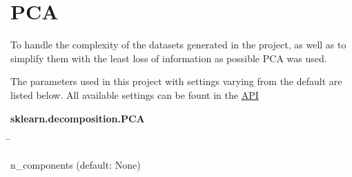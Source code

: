 \section{PCA} \label{sec:PCA}

To handle the complexity of the datasets generated in the project, as well as to simplify them with the least loss of information as possible \gls{PCA} was used. 

\autocite{jolliffe_principal_2016}
\autocite{pearson_liii_1901}

The parameters used in this project with settings varying from the default are listed below. All available settings can be fount in the
\href{https://scikit-learn.org/stable/modules/generated/sklearn.decomposition.PCA.html}{API} \autocite{pedregosa_scikit-learn_2011}

\begin{leftbar}
    \textbf{sklearn.decomposition.PCA}
    \begin{nstabbing}
        \qquad\qquad\qquad\qquad\qquad\quad\=\kill

        n\_components \> (default: None)
    \end{nstabbing}
\end{leftbar}

\begin{table}[!hbt]
    \centering
    \caption[Explained Variance by different PCA settings]{\textbf{Explained Variance by different PCA settings.}.}
    \label{tab:PCA_Dimension}
\end{table}